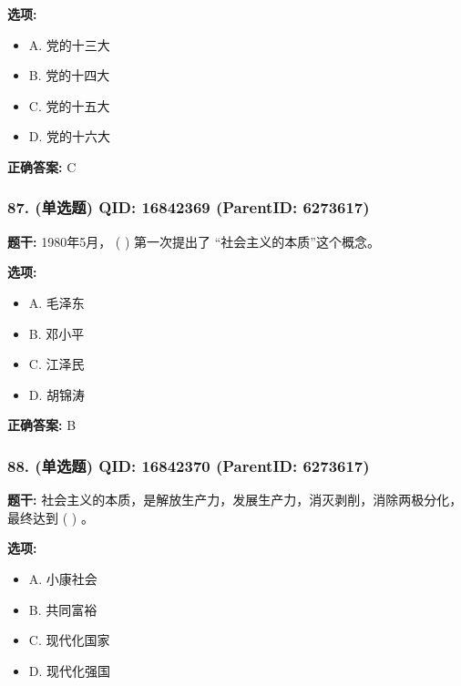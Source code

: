 \documentclass[12pt,UTF8]{ctexart}
\begin{document}
\textbf{选项:}
\begin{itemize}[leftmargin=*]

  \item A. 党的十三大

  \item B. 党的十四大

  \item C. 党的十五大

  \item D. 党的十六大

\end{itemize}

\textbf{正确答案:}
C

\vspace{0.3em}\hrulefill\vspace{0.7em}

\subsubsection*{87. (单选题) \small QID: 16842369 (ParentID: 6273617)}

\textbf{题干:}
1980年5月， ( ) 第一次提出了 “社会主义的本质”这个概念。



\textbf{选项:}
\begin{itemize}[leftmargin=*]

  \item A. 毛泽东

  \item B. 邓小平

  \item C. 江泽民

  \item D. 胡锦涛

\end{itemize}

\textbf{正确答案:}
B

\vspace{0.3em}\hrulefill\vspace{0.7em}

\subsubsection*{88. (单选题) \small QID: 16842370 (ParentID: 6273617)}

\textbf{题干:}
社会主义的本质，是解放生产力，发展生产力，消灭剥削，消除两极分化，最终达到 ( ) 。



\textbf{选项:}
\begin{itemize}[leftmargin=*]

  \item A. 小康社会

  \item B. 共同富裕

  \item C. 现代化国家

  \item D. 现代化强国

\end{itemize}
\end{document}
